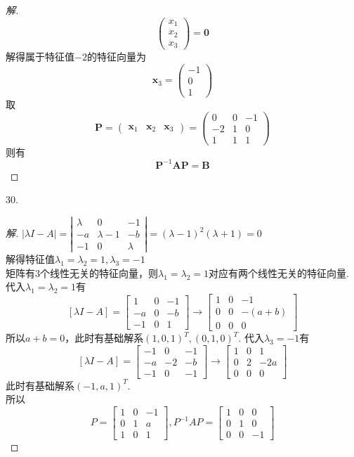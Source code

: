 \documentclass[10pt,a4paper]{report}
\def\*#1{\mathbf{#1}}
\begin{document}
\begin{proof}[解]
\[\begin{pmatrix}
	x_1 \\
	x_2 \\
	x_3
	\end{pmatrix} = \*0\]
	解得属于特征值$-2$的特征向量为
	\[\*x_3 = \begin{pmatrix}
	-1 \\
	0 \\
	1
	\end{pmatrix}\]
	取
	\[\*P = \begin{pmatrix}
	\*x_1 & \*x_2 & \*x_3
	\end{pmatrix} = \begin{pmatrix}
	0 & 0 & -1 \\
	-2 & 1 & 0 \\
	1 & 1 & 1
	\end{pmatrix}\]
	则有
	\[\*P^{-1}\*A\*P = \*B\]
\end{proof}
30.
\begin{proof}[解]
	$|\lambda I - A| = \left|
	\begin{matrix}
	\lambda & 0 & -1\\
	-a & \lambda-1 & -b\\
	-1 & 0 & \lambda
	\end{matrix}
	\right| = (\lambda - 1)^{2}(\lambda + 1) = 0$\\
	解得特征值$\lambda_1 = \lambda_2 = 1, \lambda_3 = -1$\\
	矩阵有3个线性无关的特征向量，则$\lambda_1 = \lambda_2 = 1$对应有两个线性无关的特征向量.\\
	代入$\lambda_1 = \lambda_2 = 1$有
	$$[\lambda I - A] = \left[
	\begin{matrix}
	1 & 0 & -1\\
	-a & 0 & -b\\
	-1 & 0 & 1
	\end{matrix}
	\right] \rightarrow \left[
	\begin{matrix}
	1 & 0 & -1\\
	0 & 0 & -(a+b)\\
	0 & 0 & 0
	\end{matrix}
	\right] $$
	所以$a+b = 0$，此时有基础解系$(1,0,1)^{T},(0,1,0)^{T}$.
	代入$\lambda_3 = -1$有
	$$[\lambda I - A] = \left[
	\begin{matrix}
	-1 & 0 & -1\\
	-a & -2 & -b\\
	-1 & 0 & -1
	\end{matrix}
	\right] \rightarrow \left[
	\begin{matrix}
	1 & 0 & 1\\
	0 & 2 & -2a\\
	0 & 0 & 0
	\end{matrix}
	\right] $$
	此时有基础解系$(-1,a,1)^{T}$.\\
	所以
	$$P = 
	\left[
	\begin{matrix}
	1 & 0 & -1\\
	0 & 1 & a\\
	1 & 0 & 1
	\end{matrix}
	\right], P^{-1}AP = \left[
	\begin{matrix}
	1 & 0 & 0\\
	0 & 1 & 0\\
	0 & 0 & -1
	\end{matrix}
	\right]
	$$
\end{proof}
\end{document}
